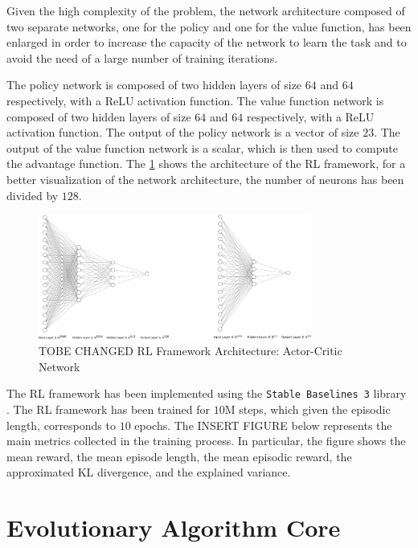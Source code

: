 Given the high complexity of the problem, the network architecture composed of two separate networks, one for the policy and one for the value function, has been enlarged in order to increase the capacity of the network to learn the task and to avoid the need of a large number of training iterations.

The policy network is composed of two hidden layers of size $64$ and $64$ respectively, with a \ac{ReLU} activation function. The value function network is composed of two hidden layers of size $64$ and $64$ respectively, with a \ac{ReLU} activation function. The output of the policy network is a vector of size $23$. The output of the value function network is a scalar, which is then used to compute the advantage function. The \cref{fig:rlarchitecture} shows the architecture of the \ac{RL} framework, for a better visualization of the network architecture, the number of neurons has been divided by $128$.

\begin{figure}[h]
    \centering
    \includegraphics[width=0.8\textwidth]{Images/rl_architecture.png}
    \caption{TOBE CHANGED RL Framework Architecture: Actor-Critic Network}
    \label{fig:rlarchitecture}
\end{figure}

The \ac{RL} framework has been implemented using the \texttt{Stable Baselines 3} library \citep{raffin_stable-baselines3_2021}. The \ac{RL} framework has been trained for $10$M steps, which given the episodic length, corresponds to $10$ epochs. The INSERT FIGURE below represents the main metrics collected in the training process. In particular, the figure shows the mean reward, the mean episode length, the mean episodic reward, the approximated KL divergence, and the explained variance.


\section{Evolutionary Algorithm Core}
\label{sec:EvolutionAlgo}


